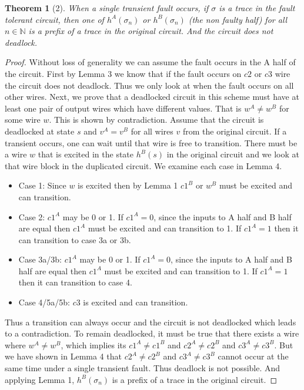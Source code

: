 \documentclass[12pt]{report}
\newtheorem*{theorem}{Theorem}
\newtheorem*{corollary}{Corollary}
\begin{document}

\begin{theorem}[2]
When a single transient fault occurs, if $\sigma$ is a trace in the fault tolerant circuit, then one of $h^{A}(\sigma_n)$ or $h^{B}(\sigma_n)$ (the non faulty half) for all $n \in \mathbb{N}$ is a prefix of a trace in the original circuit.  And the circuit does not deadlock.  
\end{theorem}
\begin{proof}
Without loss of generality we can assume the fault occurs in the A half of the circuit.  First by Lemma 3 we know that if the fault occurs on $c2$ or $c3$ wire the circuit does not deadlock.  Thus we only look at when the fault occurs on all other wires. 
Next, we prove that a deadlocked circuit in this scheme must have at least one pair of output wires which have different values.  That is $w^A\neq w^B$ for some wire $w$.
This is shown by contradiction.  Assume that the circuit is deadlocked at state $s$ and $v^A = v^B$ for all wires $v$ from the original circuit.  If a transient occurs, one can wait until that wire is free to transition.  There
 must be a wire $w$ that is excited in the state $h^B(s)$ in the original circuit and we look at that wire block in the duplicated circuit.  We examine each case in Lemma 4.
\begin{itemize}
	\item
	Case 1: Since $w$ is excited then by Lemma 1 $c1^B$ or $w^B$ must be excited and can transition.
\item
Case 2:  $c1^A$ may be 0 or 1.  If $c1^A=0$, since the inputs to A half and B half are equal then $c1^A$ must be excited and can transition to 1.  If $c1^A=1$ then it can transition to case 3a or 3b.
\item
Case 3a/3b:  $c1^A$ may be 0 or 1.  If $c1^A=0$, since the inputs to A half and B half are equal then $c1^A$ must be excited and can transition to 1.  If $c1^A=1$ then it can transition to case 4.
\item
Case 4/5a/5b:  $c3$ is excited and can transition.
\end{itemize}
Thus a transition can always occur and the circuit is not deadlocked which leads to a contradiction.  To remain deadlocked, it must be true that there exists a wire where $w^A\neq w^B$, which implies its $c1^A\neq c1^B$ and $c2^A\neq c2^B$ and $c3^A\neq c3^B$.  But we have shown in Lemma 4 that $c2^A\neq c2^B$ and $c3^A\neq c3^B$ cannot occur at the same time under a single transient fault. Thus deadlock is not possible.  And applying Lemma 1, $h^B(\sigma_n)$ is a prefix of a trace in the original circuit. 
\end{proof}
\end{document}
